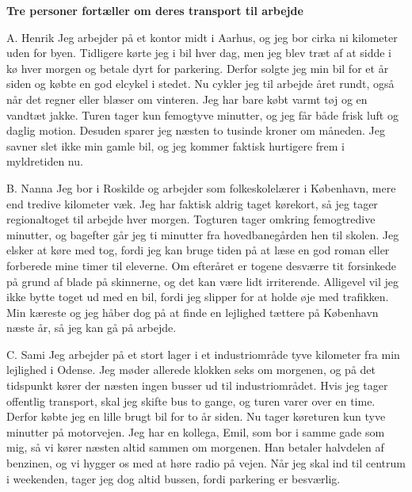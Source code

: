 \vspace{0.3em}
\begin{center}
\textbf{\large\color{NCDNavy} Tre personer fortæller om deres transport til arbejde}
\end{center}

\begin{emailbox}{A. Henrik}
Jeg arbejder på et kontor midt i Aarhus, og jeg bor cirka ni kilometer uden for byen. Tidligere kørte jeg i bil hver dag, men jeg blev træt af at sidde i kø hver morgen og betale dyrt for parkering. Derfor solgte jeg min bil for et år siden og købte en god elcykel i stedet. Nu cykler jeg til arbejde året rundt, også når det regner eller blæser om vinteren. Jeg har bare købt varmt tøj og en vandtæt jakke. Turen tager kun femogtyve minutter, og jeg får både frisk luft og daglig motion. Desuden sparer jeg næsten to tusinde kroner om måneden. Jeg savner slet ikke min gamle bil, og jeg kommer faktisk hurtigere frem i myldretiden nu.
\end{emailbox}

\begin{emailbox}{B. Nanna}
Jeg bor i Roskilde og arbejder som folkeskolelærer i København, mere end tredive kilometer væk. Jeg har faktisk aldrig taget kørekort, så jeg tager regionaltoget til arbejde hver morgen. Togturen tager omkring femogtredive minutter, og bagefter går jeg ti minutter fra hovedbanegården hen til skolen. Jeg elsker at køre med tog, fordi jeg kan bruge tiden på at læse en god roman eller forberede mine timer til eleverne. Om efteråret er togene desværre tit forsinkede på grund af blade på skinnerne, og det kan være lidt irriterende. Alligevel vil jeg ikke bytte toget ud med en bil, fordi jeg slipper for at holde øje med trafikken. Min kæreste og jeg håber dog på at finde en lejlighed tættere på København næste år, så jeg kan gå på arbejde.
\end{emailbox}

\begin{emailbox}{C. Sami}
Jeg arbejder på et stort lager i et industriområde tyve kilometer fra min lejlighed i Odense. Jeg møder allerede klokken seks om morgenen, og på det tidspunkt kører der næsten ingen busser ud til industriområdet. Hvis jeg tager offentlig transport, skal jeg skifte bus to gange, og turen varer over en time. Derfor købte jeg en lille brugt bil for to år siden. Nu tager køreturen kun tyve minutter på motorvejen. Jeg har en kollega, Emil, som bor i samme gade som mig, så vi kører næsten altid sammen om morgenen. Han betaler halvdelen af benzinen, og vi hygger os med at høre radio på vejen. Når jeg skal ind til centrum i weekenden, tager jeg dog altid bussen, fordi parkering er besværlig.
\end{emailbox}

